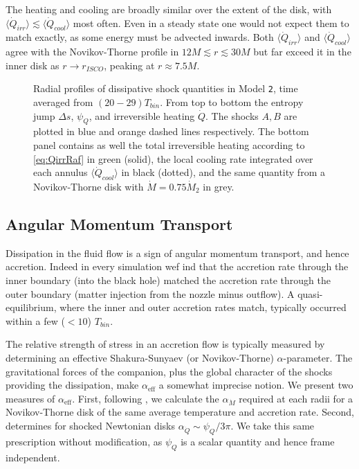 \documentclass{emulateapj}
\newcommand{\al}{\alpha}
\newcommand{\De}{\Delta}
\newcommand{\model}[1]{{Model \texttt{#1}}}
\newcommand{\avet}[1]{ \langle #1 \rangle}
\begin{document}
The heating and cooling are broadly similar over the extent of the disk, with $\avet{\dot{Q}_{irr}} \lesssim \avet{\dot{Q}_{cool}}$ most often.  Even in a steady state one would not expect them to match exactly, as some energy must be advected inwards.  Both $\avet{\dot{Q}_{irr}}$ and $\avet{\dot{Q}_{cool}}$ agree with the Novikov-Thorne profile in $12 M \lesssim r \lesssim 30M$ but far exceed it in the inner disk as $r \to r_{ISCO}$, peaking at $r \approx 7.5M$.

\begin{figure}
\caption{\label{fi:diss} Radial profiles of dissipative shock quantities in \model{2}, time averaged from $(20 - 29) T_{bin}$.  From top to bottom the entropy jump $\De s$, $\psi_Q$, and irreversible heating $\dot{Q}$. The shocks $A,B$ are plotted in blue and orange dashed lines respectively.  The bottom panel contains as well the total irreversible heating according to \eqref{eq:QirrRaf} in green (solid), the local cooling rate integrated over each annulus $\avet{\dot{Q}_{cool}}$ in black (dotted), and the same quantity from a Novikov-Thorne disk with $\dot{M} = 0.75 \dot{M}_2$ in grey.}
\end{figure}

\subsection{Angular Momentum Transport}
\label{subsec:angmom}

Dissipation in the fluid flow is a sign of angular momentum transport, and hence accretion. Indeed in every simulation wef ind that the accretion rate through the inner boundary (into the black hole) matched the accretion rate through the outer boundary (matter injection from the nozzle minus outflow).  A quasi-equilibrium, where the inner and outer accretion rates match, typically occurred within a few ($<10$) $T_{bin}$. 

The relative strength of stress in an accretion flow is typically measured by determining an effective Shakura-Sunyaev (or Novikov-Thorne) $\al$-parameter.  The gravitational forces of the companion, plus the global character of the shocks providing the dissipation, make $\al_{\text{eff}}$ a somewhat imprecise notion.  We present two measures of $\al_{\text{eff}}$.  First, following \cite{Ju16}, we calculate the $\al_{\dot{M}}$ required at each radii for a Novikov-Thorne disk of the same average temperature and accretion rate.  Second, \cite{Rafikov16} determines for shocked Newtonian disks $\al_{\dot{Q}} \sim \psi_Q / 3\pi$.  We take this same prescription without modification, as $\psi_Q$ is a scalar quantity and hence frame independent.  
\end{document}
